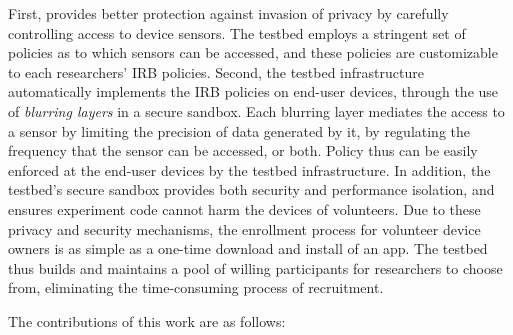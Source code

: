 First, \sysname provides better protection against invasion of privacy by carefully controlling
access to device sensors. The testbed employs a stringent set of
policies as to which sensors can be accessed, and these
policies are customizable to each researchers' IRB policies. 
Second, the testbed infrastructure automatically implements
the IRB policies on end-user devices, through the use of \textit{blurring 
layers} in a secure sandbox. Each blurring layer mediates the access to 
a sensor by limiting the precision of data generated by it, by 
regulating the frequency that the sensor can be accessed, or both. Policy thus
can be easily enforced at the end-user devices by the testbed 
infrastructure. In addition, 
the testbed's secure sandbox provides both security and performance 
isolation, and ensures experiment code cannot harm the devices of 
volunteers. Due to these privacy and security mechanisms, 
the enrollment process for volunteer device owners is as
simple as a one-time download and install of an app. The testbed thus
builds and maintains a pool of willing participants for researchers to
choose from, eliminating the time-consuming process of recruitment.


The contributions of this work are as follows:

